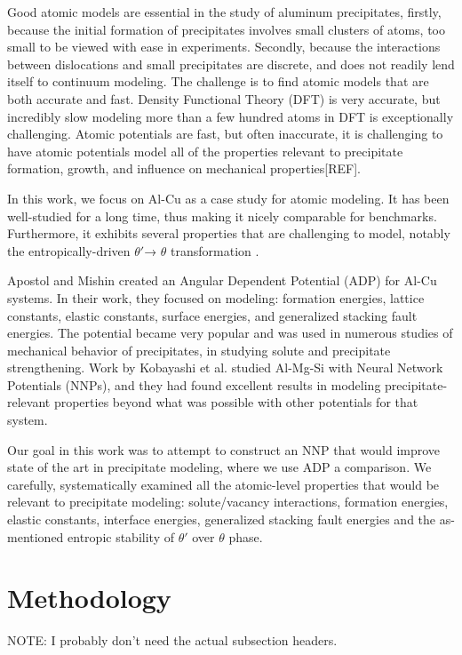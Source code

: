 \documentclass{article}
\begin{document}
Good atomic models are essential in the study of aluminum precipitates, firstly, because the initial formation of precipitates involves small clusters of atoms, too small to be viewed with ease in experiments.
Secondly, because the interactions between dislocations and small precipitates are discrete, and does not readily lend itself to continuum modeling.
The challenge is to find atomic models that are both accurate and fast.
Density Functional Theory (DFT) is very accurate, but incredibly slow modeling more than a few hundred atoms in DFT is exceptionally challenging\cite{Martin2004}.
Atomic potentials are fast, but often inaccurate, it is challenging to have atomic potentials model all of the properties relevant to precipitate formation, growth, and influence on mechanical properties[REF].

In this work, we focus on Al-Cu as a case study for atomic modeling.
It has been well-studied for a long time\cite{Preston1938StructureAlloys}, thus making it nicely comparable for benchmarks.
Furthermore, it exhibits several properties that are challenging to model, notably the entropically-driven $\theta'$→ $\theta$ transformation \cite{Wolverton2001b}.

Apostol and Mishin created an Angular Dependent Potential (ADP) for Al-Cu systems.
In their work, they focused on modeling: formation energies, lattice constants, elastic constants, surface energies, and generalized stacking fault energies\cite{Apostol2011}.
The potential became very popular and was used in numerous studies of mechanical behavior of precipitates,
in studying solute and precipitate strengthening\cite{Singh2013AnAlloy}\cite{Esteban-Manzanares2019}\cite{Wu2020AtomisticAlloys}.
Work by Kobayashi et al. \cite{Kobayashi2017} studied Al-Mg-Si with Neural Network Potentials (NNPs), and they had found excellent results in modeling precipitate-relevant properties beyond what was possible with other potentials for that system.

Our goal in this work was to attempt to construct an NNP that would improve state of the art in precipitate modeling, where we use ADP a comparison.
We carefully, systematically examined all the atomic-level properties that would be relevant to precipitate modeling: solute/vacancy interactions, formation energies, elastic constants, interface energies, generalized stacking fault energies and the as-mentioned entropic stability of $\theta'$ over $\theta$ phase.

\section{Methodology}
NOTE: I probably don't need the actual subsection headers. 
\end{document}
